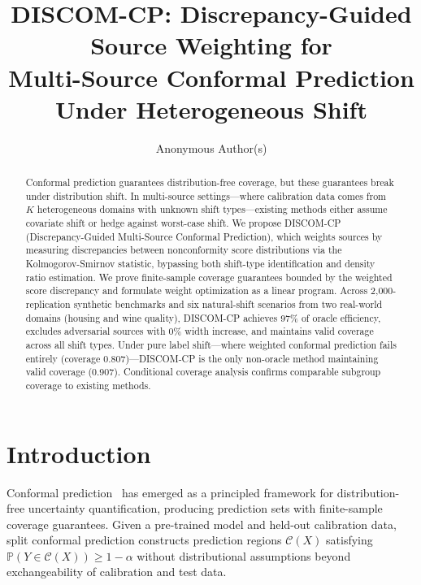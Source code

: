 \documentclass{article}
\title{DISCOM-CP: Discrepancy-Guided Source Weighting for\\Multi-Source Conformal Prediction Under Heterogeneous Shift}
\author{
  Anonymous Author(s)
}
\newcommand{\Prob}{\mathbb{P}}
\newcommand{\calC}{\mathcal{C}}
\newcommand{\DISCOM}{\textsc{DISCOM-CP}}
\begin{document}
\maketitle

\begin{abstract}
Conformal prediction guarantees distribution-free coverage, but these guarantees break under distribution shift. In multi-source settings---where calibration data comes from $K$ heterogeneous domains with unknown shift types---existing methods either assume covariate shift or hedge against worst-case shift. We propose \DISCOM{} (Discrepancy-Guided Multi-Source Conformal Prediction), which weights sources by measuring discrepancies between nonconformity score distributions via the Kolmogorov-Smirnov statistic, bypassing both shift-type identification and density ratio estimation. We prove finite-sample coverage guarantees bounded by the weighted score discrepancy and formulate weight optimization as a linear program. Across 2{,}000-replication synthetic benchmarks and six natural-shift scenarios from two real-world domains (housing and wine quality), \DISCOM{} achieves 97\% of oracle efficiency, excludes adversarial sources with 0\% width increase, and maintains valid coverage across all shift types. Under pure label shift---where weighted conformal prediction fails entirely (coverage 0.807)---\DISCOM{} is the only non-oracle method maintaining valid coverage (0.907). Conditional coverage analysis confirms comparable subgroup coverage to existing methods.
\end{abstract}

\section{Introduction}
\label{sec:intro}

Conformal prediction~\citep{vovk2005algorithmic} has emerged as a principled framework for distribution-free uncertainty quantification, producing prediction sets with finite-sample coverage guarantees. Given a pre-trained model and held-out calibration data, split conformal prediction constructs prediction regions $\calC(X)$ satisfying $\Prob(Y \in \calC(X)) \geq 1 - \alpha$ without distributional assumptions beyond exchangeability of calibration and test data.
\end{document}
